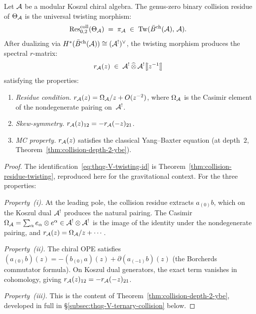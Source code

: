 \begin{theorem}[Collision residue = twisting morphism, revisited;
\ClaimStatusProvedHere]
\label{thm:thqg-V-collision-twisting}
Let $\mathcal{A}$ be a modular Koszul chiral algebra. The genus-zero binary
collision residue of $\Theta_{\mathcal{A}}$ is the universal twisting morphism:
\begin{equation}\label{eq:thqg-V-twisting-id}
\operatorname{Res}^{\mathrm{coll}}_{0,2}(\Theta_{\mathcal{A}})
\;=\;
\pi_{\mathcal{A}}
\;\in\;
\mathrm{Tw}(\bar{B}^{\text{ch}}(\mathcal{A}),\,\mathcal{A}).
\end{equation}
After dualizing via $H^*(\bar{B}^{\text{ch}}(\mathcal{A})) \cong (\mathcal{A}^!)^\vee$, the
twisting morphism produces the spectral $r$-matrix:
\begin{equation}\label{eq:thqg-V-r-matrix-def}
r_{\mathcal{A}}(z)
\;\in\;
\mathcal{A}^! \,\widehat{\otimes}\, \mathcal{A}^!\bigl[\![z^{-1}]\!\bigr]
\end{equation}
satisfying the properties:
\begin{enumerate}[label=\textup{(\roman*)}]
\item \emph{Residue condition.}
 $r_{\mathcal{A}}(z) = \Omega_{\mathcal{A}} / z + O(z^{-2})$,
 where $\Omega_{\mathcal{A}}$ is the Casimir element of the nondegenerate
 pairing on~$\mathcal{A}^!$.
\item \emph{Skew-symmetry.}
 $r_{\mathcal{A}}(z)_{12} = -r_{\mathcal{A}}(-z)_{21}$.
\item \emph{MC property.}
 $r_{\mathcal{A}}(z)$ satisfies the classical Yang--Baxter equation
 \textup{(}at depth~$2$,
 Theorem~\textup{\ref{thm:collision-depth-2-ybe})}.
\end{enumerate}
\end{theorem}

\begin{proof}
The identification~\eqref{eq:thqg-V-twisting-id} is
Theorem~\ref{thm:collision-residue-twisting}, reproduced here for
the gravitational context. For the three properties:

\emph{Property~(i).}
At the leading pole, the collision residue extracts $a_{(0)}b$,
which on the Koszul dual $\mathcal{A}^!$ produces the natural pairing.
The Casimir $\Omega_{\mathcal{A}} = \sum_\alpha e_\alpha \otimes e^\alpha
\in \mathcal{A}^! \otimes \mathcal{A}^!$ is the image of the identity under the
nondegenerate pairing, and $r_{\mathcal{A}}(z) = \Omega_{\mathcal{A}}/z + \cdots$.

\emph{Property~(ii).}
The chiral OPE satisfies
$(a_{(0)}b)(z) = -(b_{(0)}a)(z) + \partial(a_{(-1)}b)(z)$
(the Borcherds commutator formula). On Koszul dual generators,
the exact term vanishes in cohomology, giving
$r_{\mathcal{A}}(z)_{12} = -r_{\mathcal{A}}(-z)_{21}$.

\emph{Property~(iii).}
This is the content of Theorem~\ref{thm:collision-depth-2-ybe},
developed in full in
\S\ref{subsec:thqg-V-ternary-collision} below.
\end{proof}


